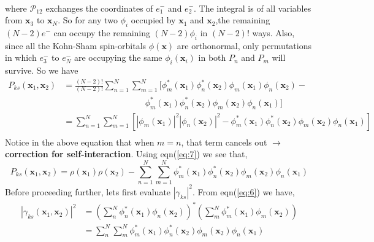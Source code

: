 \documentclass{article}
\begin{document}
\begin{Large}
\begin{flushleft}
\begin{equation}
\begin{split}
  \end{split}
  \end{equation}
  where $\mathcal{P}_{12}$ exchanges the coordinates of $e^-_1$ and $e^-_2$. The integral is of all variables from $\textbf{x}_3$ to $\textbf{x}_N$. So for any two $\phi_i$ occupied by $\textbf{x}_1$ and $\textbf{x}_2$,the remaining $(N-2)e^-$ can occupy the remaining $(N-2)\phi_i$ in $(N-2)!$ ways. Also, since all the Kohn-Sham spin-orbitals $\phi(\textbf{x})$ are orthonormal, only permutations in which $e^-_3$ to $e^-_N$ are occupying the same $\phi_i(\textbf{x}_i)$ in both $P_n$ and $P_m$ will survive. So we have
  \begin{equation}\label{eq:35}
  \begin{split}
  P_{ks}(\textbf{x}_1,\textbf{x}_2) &= \frac{(N-2)!}{(N-2)!}\sum_{n=1}^{N}\sum_{m=1}^{N}[\phi^*_m(\textbf{x}_1)\phi^*_n(\textbf{x}_2)\phi_m(\textbf{x}_1)\phi_n(\textbf{x}_2) -\\
  & \hspace{4cm}\phi^*_m(\textbf{x}_1)\phi^*_n(\textbf{x}_2)\phi_m(\textbf{x}_2)\phi_n(\textbf{x}_1)]\\
  & = \sum_{n=1}^{N}\sum_{m=1}^{N}\left[|\phi_m(\textbf{x}_1)|^2|\phi_n(\textbf{x}_2)|^2-\phi^*_m(\textbf{x}_1)\phi^*_n(\textbf{x}_2)\phi_m(\textbf{x}_2)\phi_n(\textbf{x}_1)\right]\\
  \end{split}
  \end{equation}
  Notice in the above equation that when $m=n$, that term cancels out $\rightarrow$ \textbf{correction for self-interaction}. Using eqn(\ref{eq:7}) we see that,
  \begin{equation}\label{eq:36}
   P_{ks}(\textbf{x}_1,\textbf{x}_2) = \rho(\textbf{x}_1)\rho(\textbf{x}_2) - \sum_{n=1}^{N}\sum_{m=1}^{N}\phi^*_m(\textbf{x}_1)\phi^*_n(\textbf{x}_2)\phi_m(\textbf{x}_2)\phi_n(\textbf{x}_1)
  \end{equation}
  Before proceeding further, lets first evaluate $|\gamma_{ks}|^2$. From eqn(\ref{eq:6}) we have,
  \begin{equation}\label{eq:37}
  \begin{split}
  |\gamma_{ks}(\textbf{x}_1,\textbf{x}_2)|^2 &= \left(\sum_n^N\phi_n^*(\textbf{x}_1)\phi_n(\textbf{x}_2)\right)^*\left(\sum_m^N\phi_m^*(\textbf{x}_1)\phi_m(\textbf{x}_2)\right)\\
  & = \sum_{n}^{N}\sum_{m}^{N}\phi^*_m(\textbf{x}_1)\phi^*_n(\textbf{x}_2)\phi_m(\textbf{x}_2)\phi_n(\textbf{x}_1)
  \end{split}
  \end{equation}

\end{flushleft}
\end{Large}
\end{document}
